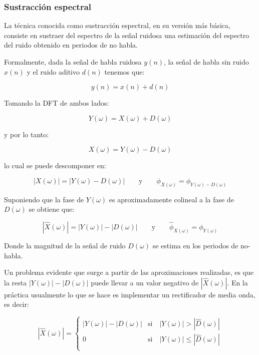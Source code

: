 \subsubsection{Sustracción espectral}
\label{sec:sustraccion_espectral}

La técnica conocida como sustracción espectral, en su versión más básica, consiste en sustraer del espectro de la señal ruidosa una estimación del espectro del ruido obtenido en periodos de no habla.

Formalmente, dada la señal de habla ruidosa $y(n)$, la señal de habla sin ruido $x(n)$ y el ruido aditivo $d(n)$ tenemos que:

\begin{equation*}
	y(n) = x(n) + d(n)
\end{equation*}

Tomando la DFT de ambos lados:

\begin{equation*}
	Y(\omega) = X(\omega) + D(\omega)
\end{equation*}

y por lo tanto:

\begin{equation*}
	X(\omega) = Y(\omega) - D(\omega)
\end{equation*}

lo cual se puede descomponer en:

\begin{equation*}
	|X(\omega)| = |Y(\omega) - D(\omega)| \qquad \text{y} \qquad \phi_{X(\omega)} = \phi_{Y(\omega) - D(\omega)}
\end{equation*}

Suponiendo que la fase de $Y(\omega)$ es aproximadamente colineal a la fase de $D(\omega)$ se obtiene que:

\begin{equation*}
	|\hat{X}(\omega)| = |Y(\omega)| - |D(\omega)| \qquad \text{y} \qquad \hat{\phi}_{X(\omega)} = \phi_{Y(\omega)}
\end{equation*}

Donde la magnitud de la señal de ruido $D(\omega)$ se estima en los periodos de no-habla.

Un problema evidente que surge a partir de las aproximaciones realizadas, es que la resta $|Y(\omega)| - |D(\omega)|$ puede llevar a un valor negativo de $|\hat{X}(\omega)|$. En la práctica usualmente lo que se hace es implementar un rectificador de media onda, es decir:

\begin{equation*}
	|\hat{X}(\omega)| = \begin{cases} 
		|Y(\omega)| - |D(\omega)| & \text{si} \quad |Y(\omega)| >  |\hat{D}(\omega)| \\
		0 & \text{si} \quad |Y(\omega)| \leq  |\hat{D}(\omega)|\\
	\end{cases}
\end{equation*}

